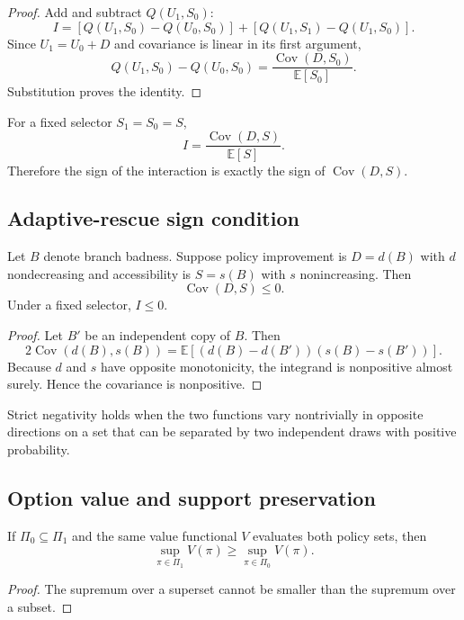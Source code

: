 \begin{proof}
Add and subtract $Q(U_1,S_0)$:
\[
I
=
\left[Q(U_1,S_0)-Q(U_0,S_0)\right]
+
\left[Q(U_1,S_1)-Q(U_1,S_0)\right].
\]
Since $U_1=U_0+D$ and covariance is linear in its first argument,
\[
Q(U_1,S_0)-Q(U_0,S_0)
=
\frac{\operatorname{Cov}(D,S_0)}{\mathbb E[S_0]}.
\]
Substitution proves the identity.
\end{proof}

For a fixed selector $S_1=S_0=S$,
\[
I
=
\frac{\operatorname{Cov}(D,S)}{\mathbb E[S]}.
\]
Therefore the sign of the interaction is exactly the sign of $\operatorname{Cov}(D,S)$.

\subsection{Adaptive-rescue sign condition}

\begin{corollary}
Let $B$ denote branch badness. Suppose policy improvement is $D=d(B)$ with $d$ nondecreasing and accessibility is $S=s(B)$ with $s$ nonincreasing. Then
\[
\operatorname{Cov}(D,S)\le 0.
\]
Under a fixed selector, $I\le 0$.
\end{corollary}

\begin{proof}
Let $B'$ be an independent copy of $B$. Then
\[
2\operatorname{Cov}(d(B),s(B))
=
\mathbb E[(d(B)-d(B'))(s(B)-s(B'))].
\]
Because $d$ and $s$ have opposite monotonicity, the integrand is nonpositive almost surely. Hence the covariance is nonpositive.
\end{proof}

Strict negativity holds when the two functions vary nontrivially in opposite directions on a set that can be separated by two independent draws with positive probability.

\subsection{Option value and support preservation}

\begin{proposition}
If $\Pi_0\subseteq\Pi_1$ and the same value functional $V$ evaluates both policy sets, then
\[
\sup_{\pi\in\Pi_1}V(\pi)
\ge
\sup_{\pi\in\Pi_0}V(\pi).
\]
\end{proposition}

\begin{proof}
The supremum over a superset cannot be smaller than the supremum over a subset.
\end{proof}

